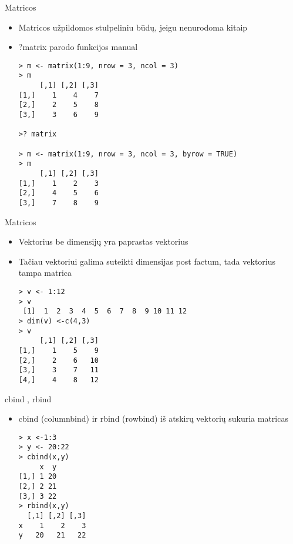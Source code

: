 \documentclass[11pt,xcolor=table]{beamer}
\begin{document}
\begin{frame}[fragile]{Matricos}
\begin{itemize}
\item Matricos užpildomos stulpeliniu būdų, jeigu nenurodoma kitaip
\item ?matrix parodo funkcijos manual
\begin{lstlisting}
> m <- matrix(1:9, nrow = 3, ncol = 3)
> m
     [,1] [,2] [,3]
[1,]    1    4    7
[2,]    2    5    8
[3,]    3    6    9

>? matrix

> m <- matrix(1:9, nrow = 3, ncol = 3, byrow = TRUE)
> m
     [,1] [,2] [,3]
[1,]    1    2    3
[2,]    4    5    6
[3,]    7    8    9

\end{lstlisting}
\end{itemize}
\end{frame}


\begin{frame}[fragile]{Matricos}
\begin{itemize}
\item Vektorius be dimensijų yra paprastas vektorius
\item Tačiau vektoriui galima suteikti dimensijas post factum, tada vektorius tampa matrica
\begin{lstlisting}
> v <- 1:12
> v
 [1]  1  2  3  4  5  6  7  8  9 10 11 12
> dim(v) <-c(4,3)
> v
     [,1] [,2] [,3]
[1,]    1    5    9
[2,]    2    6   10
[3,]    3    7   11
[4,]    4    8   12
\end{lstlisting}
\end{itemize}
\end{frame}


\begin{frame}[fragile]{cbind , rbind}
\begin{itemize}
\item cbind (columnbind) ir rbind (rowbind) iš atskirų vektorių sukuria matricas
\begin{lstlisting}
> x <-1:3
> y <- 20:22
> cbind(x,y)
     x  y
[1,] 1 20
[2,] 2 21
[3,] 3 22
> rbind(x,y)
  [,1] [,2] [,3]
x    1    2    3
y   20   21   22
\end{lstlisting}
\end{itemize}
\end{frame}
\end{document}
